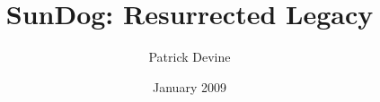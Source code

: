 \documentclass{book}
\begin{document}
\title{SunDog: Resurrected Legacy}
\author{Patrick Devine}
\date{January 2009}
\maketitle

\tableofcontents





\end{document}
